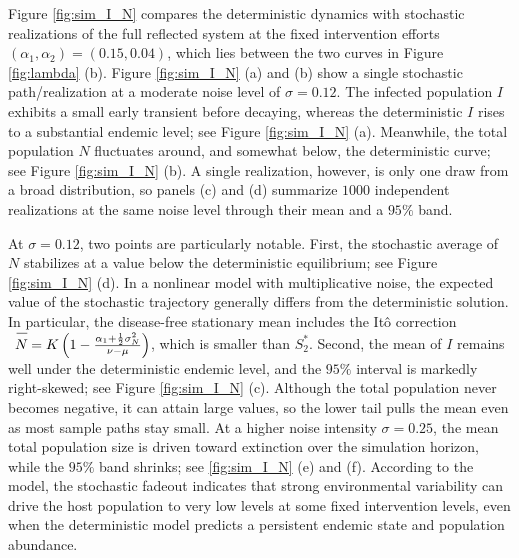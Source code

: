 \documentclass[12pt,a4paper,reqno]{amsart}
\theoremstyle{definition}
\theoremstyle{remark}
\theoremstyle{plain}
\let\svoverline\overline
\newcommand{\uc}[1]{\mkern 5mu\svoverline{\mkern-1mu#1\mkern-0.3mu \rule{0pt}{3.5mm}}\mkern 0mu}
\let\overline\uc
\begin{document}
Figure \ref{fig:sim_I_N} compares the deterministic dynamics with stochastic realizations of the full reflected system at the fixed intervention efforts $(\alpha_1,\alpha_2)=(0.15,0.04)$, which lies between the two curves in Figure \ref{fig:lambda} (b). Figure \ref{fig:sim_I_N} (a) and (b) show a single stochastic path/realization at a moderate noise level of $\sigma=0.12$. The infected population $I$ exhibits a small early transient before decaying, whereas the deterministic $I$ rises to a substantial endemic level; see Figure \ref{fig:sim_I_N} (a). Meanwhile, the total population $N$ fluctuates around, and somewhat below, the deterministic curve; see Figure \ref{fig:sim_I_N} (b). A single realization, however, is only one draw from a broad distribution, so panels (c) and (d) summarize $1000$ independent realizations at the same noise level through their mean and a $95\%$ band.

At $\sigma=0.12$, two points are particularly notable. First, the stochastic average of $N$ stabilizes at a value below the deterministic equilibrium; see Figure \ref{fig:sim_I_N} (d). In a nonlinear model with multiplicative noise, the expected value of the stochastic trajectory generally differs from the deterministic solution. In particular, the disease-free stationary mean includes the It\^o correction $\overline N=K\left(1-\frac{\alpha_1+\frac12\sigma_N^2}{\nu-\mu}\right)$, which is smaller than $S_2^{*}$. Second, the mean of $I$ remains well under the deterministic endemic level, and the $95\%$ interval is markedly right-skewed; see Figure \ref{fig:sim_I_N} (c). Although the total population never becomes negative, it can attain large values, so the lower tail pulls the mean even as most sample paths stay small. At a higher noise intensity $\sigma=0.25$, the mean total population size is driven toward extinction over the simulation horizon, while the $95\%$ band shrinks; see \ref{fig:sim_I_N} (e) and (f). According to the model, the stochastic fadeout indicates that strong environmental variability can drive the host population to very low levels at some fixed intervention levels, even when the deterministic model predicts a persistent endemic state and population abundance.
\end{document}
